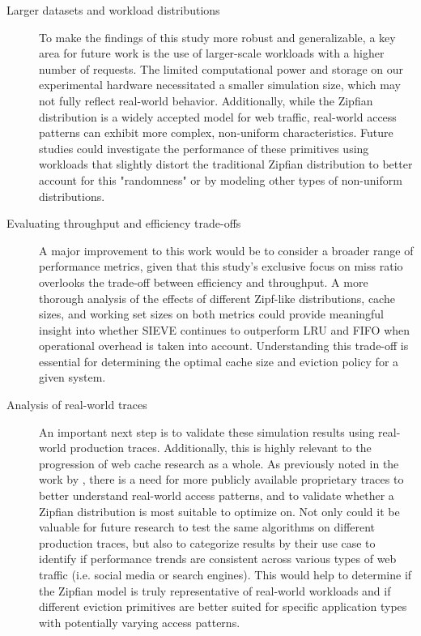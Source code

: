 \begin{description}

    \item[Larger datasets and workload distributions]
    To make the findings of this study more robust and generalizable, a key area for future work is the use of larger-scale workloads with a higher number of requests. The limited computational power and storage on our experimental hardware necessitated a smaller simulation size, which may not fully reflect real-world behavior. Additionally, while the Zipfian distribution is a widely accepted model for web traffic, real-world access patterns can exhibit more complex, non-uniform characteristics. Future studies could investigate the performance of these primitives using workloads that slightly distort the traditional Zipfian distribution to better account for this "randomness" or by modeling other types of non-uniform distributions.


    \item[Evaluating throughput and efficiency trade-offs]
    A major improvement to this work would be to consider a broader range of performance metrics, given that this study's exclusive focus on miss ratio overlooks the trade-off between efficiency and throughput. A more thorough analysis of the effects of different Zipf-like distributions, cache sizes, and working set sizes on both metrics could provide meaningful insight into whether SIEVE continues to outperform LRU and FIFO when operational overhead is taken into account. Understanding this trade-off is essential for determining the optimal cache size and eviction policy for a given system.

    \item[Analysis of real-world traces]
    An important next step is to validate these simulation results using real-world production traces. Additionally, this is highly relevant to the progression of web cache research as a whole. As previously noted in the work by \citeauthor{twitter-analysis}, there is a need for more publicly available proprietary traces to better understand real-world access patterns, and to validate whether a Zipfian distribution is most suitable to optimize on. Not only could it be valuable for future research to test the same algorithms on different production traces, but also to categorize results by their use case to identify if performance trends are consistent across various types of web traffic (i.e. social media or search engines). This would help to determine if the Zipfian model is truly representative of real-world workloads and if different eviction primitives are better suited for specific application types with potentially varying access patterns.



\end{description}
